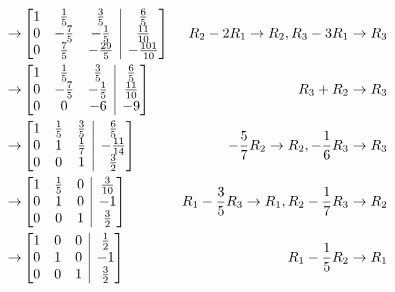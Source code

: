 \begin{Answer}
\begin{align*}
\\
\to &
\left[
\begin{array}{@{}ccc|c@{}}
1 & \frac{1}{5} & \frac{3}{5} & \frac{6}{5}\\
0 & -\frac{7}{5} & -\frac{1}{5} & \frac{11}{10}\\
0 & \frac{7}{5} & -\frac{29}{5} & -\frac{101}{10}
\end{array}
\right] & R_2 - 2R_1 \to R_2, R_3 - 3R_1 \to R_3
\\
\to &
\left[
\begin{array}{@{}ccc|c@{}}
1 & \frac{1}{5} & \frac{3}{5} & \frac{6}{5}\\
0 & -\frac{7}{5} & -\frac{1}{5} & \frac{11}{10}\\
0 & 0 & -6 & -9
\end{array}
\right] & R_3 + R_2 \to R_3
\\
\to &
\left[
\begin{array}{@{}ccc|c@{}}
1 & \frac{1}{5} & \frac{3}{5} & \frac{6}{5}\\
0 & 1 & \frac{1}{7} & -\frac{11}{14}\\
0 & 0 & 1 & \frac{3}{2}
\end{array}
\right] & -\frac{5}{7}R_2 \to R_2, -\frac{1}{6}R_3 \to R_3
\\
\to &
\left[
\begin{array}{@{}ccc|c@{}}
1 & \frac{1}{5} & 0 & \frac{3}{10}\\
0 & 1 & 0 & -1\\
0 & 0 & 1 & \frac{3}{2}
\end{array}
\right] & R_1 - \frac{3}{5}R_3 \to R_1, R_2 - \frac{1}{7}R_3 \to R_2
\\
\to &
\left[
\begin{array}{@{}ccc|c@{}}
1 & 0 & 0 & \frac{1}{2}\\
0 & 1 & 0 & -1\\
0 & 0 & 1 & \frac{3}{2}
\end{array}
\right] & R_1 - \frac{1}{5}R_2 \rightarrow R_1
\end{align*}
\end{Answer}

